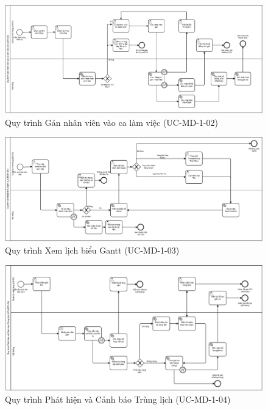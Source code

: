 \begin{figure}[H]
	\centering
	\includegraphics[width=15cm]{Sections/tong_quan/functional_spec/img/1.2.png}

     \vspace{0.5cm}
    \caption{Quy trình Gán nhân viên vào ca làm việc (UC-MD-1-02)}
\end{figure}



\begin{figure}[H]
	\centering
	\includegraphics[width=15cm]{Sections/tong_quan/functional_spec/img/1.3.png}

     \vspace{0.5cm}
    \caption{Quy trình Xem lịch biểu Gantt (UC-MD-1-03)}
\end{figure}


\begin{figure}[H]
	\centering
	\includegraphics[width=15cm]{Sections/tong_quan/functional_spec/img/1.4.png}

     \vspace{0.5cm}
    \caption{Quy trình  Phát hiện và Cảnh báo Trùng lịch (UC-MD-1-04)}
\end{figure}

